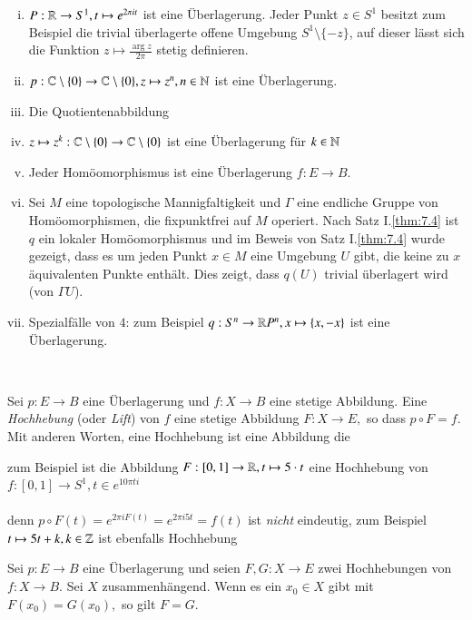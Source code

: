 \documentclass[a4paper,10pt]{scrartcl}
\begin{document}
\begin{exs*}
 \begin{enumerate}[(i)]
  \item $P: \mathbb{R}\to S^1, t\mapsto e^{2\pi it}$ ist eine Überlagerung. Jeder Punkt $z\in S^1$ besitzt zum Beispiel die trivial überlagerte offene Umgebung $S^1\setminus\{-z\}$, 
auf dieser lässt sich die Funktion $z\mapsto \frac{\arg{z}}{2\pi}$ stetig definieren. \\
\fixme[fig70]
  \item $p:\mathbb{C}\setminus\{0\}\to \mathbb{C} \setminus\{0\}, z \mapsto z^n, n\in \mathbb{N}$ ist eine Überlagerung.
  \item Die Quotientenabbildung 
  \item $z\mapsto z^k: \mathbb{C} \setminus \{0\} \to \mathbb{C} \setminus\{0\}$ ist eine Überlagerung für $k\in \mathbb{N}$
  \item Jeder Homöomorphismus ist eine Überlagerung $f: E\to B$.
  \item Sei $M$ eine topologische Mannigfaltigkeit und $\Gamma$ eine endliche Gruppe von Homöomorphismen, 
die fixpunktfrei auf $M$ operiert. Nach Satz I.\ref{thm:7.4} ist $q$ ein lokaler Homöomorphismus und im Beweis von Satz I.\ref{thm:7.4} wurde gezeigt, dass es um jeden Punkt $x\in M$ eine Umgebung $U$ gibt, die keine zu $x$ äquivalenten Punkte enthält. Dies zeigt, dass $q(U)$ trivial überlagert wird (von $\Gamma U$).
  \item Spezialfälle von $4$: zum Beispiel $q: S^n\to \mathbb{R} P^n, x \mapsto \{x, -x\}$ ist eine Überlagerung.\\
\fixme[fig71]
 \end{enumerate}
\end{exs*}
\\
\begin{df}
 Sei $p: E\to B$ eine Überlagerung und $f:X\to B$ eine stetige Abbildung.  Eine \emph{Hochhebung} (oder \emph{Lift}) von $f$ eine stetige Abbildung $F: X \to E,$ so dass $p\circ F=f$. Mit anderen Worten, eine Hochhebung ist eine Abbildung die\\
\end{df}
zum Beispiel ist die Abbildung $F:[0,1]\to \mathbb{R}, t\mapsto  5 \cdot t$ eine Hochhebung von $f: [0,1]\to S^1, t \in e^{10\pi t i}$\\
\fixme[fig73]\\
denn $p\circ F(t)=e^{2\pi i F(t)}=e^{2\pi i 5 t}=f(t)$ ist \emph{nicht} eindeutig, zum Beispiel 
$t\mapsto 5t+k, k\in \mathbb{Z}$ ist ebenfalls Hochhebung
\begin{st}\label{thm2:2.3}
Sei $p: E \to B$ eine Überlagerung und seien $F,G: X\to E$ zwei Hochhebungen von $f:X\to B$. Sei $X$ zusammenhängend. Wenn es ein $x_0 \in X$ gibt mit $F(x_0)=G(x_0),$ so gilt $F=G$. 
\end{st}
\end{document}
